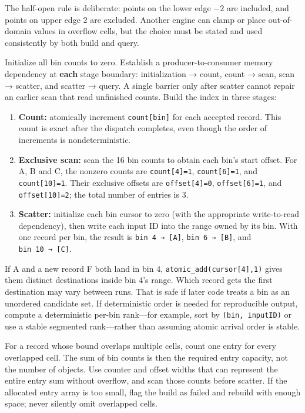 The half-open rule is deliberate: points on the lower edge \(-2\) are included, and points on upper edge \(2\) are excluded. Another engine can clamp or place out-of-domain values in overflow cells, but the choice must be stated and used consistently by both build and query.

Initialize all bin counts to zero. Establish a producer-to-consumer memory dependency at \textbf{each} stage boundary: initialization → count, count → scan, scan → scatter, and scatter → query. A single barrier only after scatter cannot repair an earlier scan that read unfinished counts. Build the index in three stages:

\begin{enumerate}
\def\labelenumi{\arabic{enumi}.}
\tightlist
\item
  \textbf{Count:} atomically increment \texttt{count{[}bin{]}} for each accepted record. This count is exact after the dispatch completes, even though the order of increments is nondeterministic.
\item
  \textbf{Exclusive scan:} scan the 16 bin counts to obtain each bin's start offset. For A, B and C, the nonzero counts are \texttt{count{[}4{]}=1}, \texttt{count{[}6{]}=1}, and \texttt{count{[}10{]}=1}. Their exclusive offsets are \texttt{offset{[}4{]}=0}, \texttt{offset{[}6{]}=1}, and \texttt{offset{[}10{]}=2}; the total number of entries is 3.
\item
  \textbf{Scatter:} initialize each bin cursor to zero (with the appropriate write-to-read dependency), then write each input ID into the range owned by its bin. With one record per bin, the result is \texttt{bin\ 4\ →\ {[}A{]}}, \texttt{bin\ 6\ →\ {[}B{]}}, and \texttt{bin\ 10\ →\ {[}C{]}}.
\end{enumerate}

If A and a new record F both land in bin 4, \texttt{atomic\_add(cursor{[}4{]},1)} gives them distinct destinations inside bin 4's range. Which record gets the first destination may vary between runs. That is safe if later code treats a bin as an unordered candidate set. If deterministic order is needed for reproducible output, compute a deterministic per-bin rank---for example, sort by \texttt{(bin,\ inputID)} or use a stable segmented rank---rather than assuming atomic arrival order is stable.

For a record whose bound overlaps multiple cells, count one entry for every overlapped cell. The sum of bin counts is then the required entry capacity, not the number of objects. Use counter and offset widths that can represent the entire entry sum without overflow, and scan those counts before scatter. If the allocated entry array is too small, flag the build as failed and rebuild with enough space; never silently omit overlapped cells.

